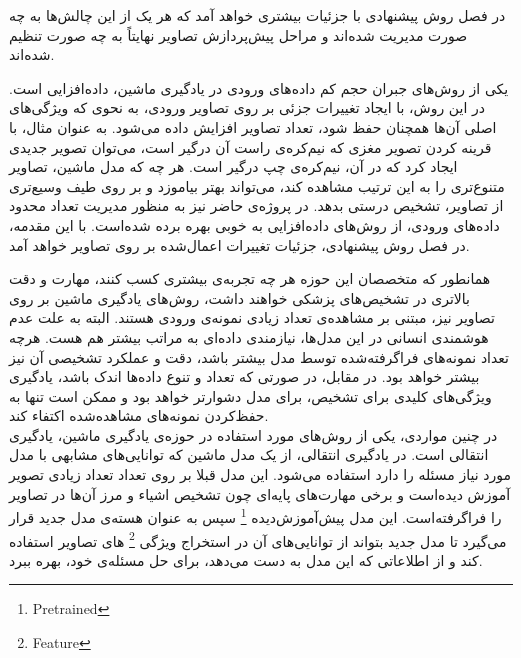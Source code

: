 در فصل روش پیشنهادی با جزئیات بیشتری خواهد آمد که هر یک از این چالش‌ها به چه صورت مدیریت شده‌اند و مراحل پیش‌پردازش تصاویر نهایتاً به چه صورت تنظیم شده‌اند.





یکی از روش‌های جبران حجم کم داده‌های ورودی در یادگیری ماشین، داده‌افزایی است.
در این روش، با ایجاد تغییرات جزئی بر روی تصاویر ورودی، به نحوی که ویژگی‌های اصلی آن‌ها همچنان حفظ شود، تعداد تصاویر افزایش داده می‌شود.
به عنوان مثال، با قرینه کردن تصویر مغزی که نیم‌کره‌ی راست آن درگیر است، می‌‌توان تصویر جدیدی ایجاد کرد که در آن، نیم‌کره‌ی چپ درگیر است.
هر چه که مدل ماشین، تصاویر متنوع‌تری را به این ترتیب مشاهده کند، می‌تواند بهتر بیاموزد و بر روی طیف وسیع‌تری از تصاویر، تشخیص درستی بدهد.
در پروژه‌ی حاضر نیز به منظور مدیریت تعداد محدود داده‌های ورودی، از روش‌های داده‌افزایی به خوبی بهره برده شده‌است.
با این مقدمه، در فصل روش پیشنهادی، جزئیات تغییرات اعمال‌شده بر روی تصاویر خواهد آمد.


همانطور که متخصصان این حوزه هر چه تجربه‌ی بیشتری کسب کنند، مهارت و دقت بالاتری در تشخیص‌های پزشکی خواهند داشت،
روش‌های یادگیری ماشین بر روی تصاویر نیز، مبتنی بر مشاهده‌ی تعداد زیادی نمونه‌ی ورودی هستند.
البته به علت عدم هوشمندی انسانی در این مدل‌ها، نیازمندی داده‌ای به مراتب بیشتر هم هست.
هرچه تعداد نمونه‌های فراگرفته‌شده توسط مدل بیشتر باشد، دقت و عملکرد تشخیصی آن نیز بیشتر خواهد بود.
در مقابل، در صورتی که تعداد و تنوع داده‌ها اندک باشد، یادگیری ویژگی‌های کلیدی برای تشخیص، برای مدل دشوارتر خواهد بود و ممکن است تنها به حفظ‌کردن نمونه‌های مشاهده‌شده اکتفاء کند.\\

در چنین مواردی، یکی از روش‌های مورد استفاده در حوزه‌ی یادگیری ماشین، یادگیری انتقالی است.
در یادگیری انتقالی، از یک مدل ماشین که توانایی‌های مشابهی با مدل مورد نیاز مسئله را دارد
استفاده می‌شود.
این مدل قبلا بر روی تعداد تعداد زیادی تصویر آموزش دیده‌است و برخی مهارت‌های پایه‌ای چون تشخیص اشیاء و مرز آن‌ها در تصاویر را فراگرفته‌است.
این مدل پیش‌آموزش‌دیده
\footnote{Pretrained}
سپس
به عنوان هسته‌ی مدل جدید قرار می‌گیرد تا مدل جدید بتواند از توانایی‌های آن در استخراج ویژگی
\footnote{Feature}
های تصاویر استفاده کند 
و از اطلاعاتی که این مدل به دست می‌دهد، برای حل مسئله‌ی خود، بهره ببرد.\\

